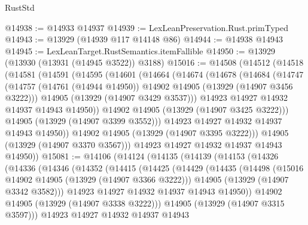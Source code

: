 \begin{lexlean}{RustStd}
\begin{coremodule}
@14938 := @14933 @14937
@14939 := LexLeanPreservation.Rust.primTyped
@14943 := @13929 (@14939 @117 @14148 @86)
@14944 := @14938 @14943
@14945 := LexLeanTarget.RustSemantics.itemFallible
@14950 := @13929 (@13930 (@13931 (@14945 @3522)) @3188)
@15016 := @14508
    (@14512
      (@14518
        (@14581
          (@14591
            (@14595
              (@14601
                (@14664
                  (@14674
                    (@14678
                      (@14684
                        (@14747
                          (@14757
                            (@14761 (@14944 @14950))
                            @14902
                            @14905
                            (@13929 (@14907 @3456 @3222)))
                          @14905
                          (@13929 (@14907 @3429 @3537)))
                        @14923
                        @14927
                        @14932
                        @14937
                        @14943
                        @14950))
                    @14902
                    @14905
                    (@13929 (@14907 @3425 @3222)))
                  @14905
                  (@13929 (@14907 @3399 @3552)))
                @14923
                @14927
                @14932
                @14937
                @14943
                @14950))
            @14902
            @14905
            (@13929 (@14907 @3395 @3222)))
          @14905
          (@13929 (@14907 @3370 @3567)))
        @14923
        @14927
        @14932
        @14937
        @14943
        @14950))
@15081 := @14106
    (@14124
      (@14135
        (@14139
          (@14153
            (@14326
              (@14336
                (@14346
                  (@14352
                    (@14415
                      (@14425
                        (@14429
                          (@14435
                            (@14498
                              (@15016 @14902 @14905 (@13929 (@14907 @3366 @3222)))
                              @14905
                              (@13929 (@14907 @3342 @3582)))
                            @14923
                            @14927
                            @14932
                            @14937
                            @14943
                            @14950))
                        @14902
                        @14905
                        (@13929 (@14907 @3338 @3222)))
                      @14905
                      (@13929 (@14907 @3315 @3597)))
                    @14923
                    @14927
                    @14932
                    @14937
                    @14943

\end{coremodule}
\end{lexlean}
